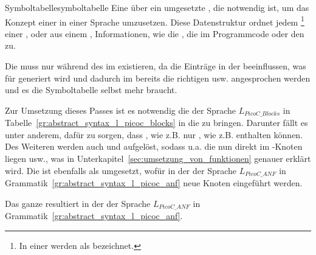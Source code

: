 \begin{Definition}{Symboltabelle}{symboltabelle}
  Eine über ein  umgesetzte , die notwendig ist, um das Konzept einer  in einer Sprache umzusetzen. Diese Datenstruktur ordnet jedem \footnote{In einer  werden  als  bezeichnet.} einer ,  oder  aus einem , Informationen, wie die , die  im Programmcode oder den  zu.

  Die  muss nur während des  im  existieren, da die Einträge in der  beeinflussen, was für  generiert wird und dadurch im  bereits die richtigen  usw. angesprochen werden und es die Symboltabelle selbst  mehr braucht.
\end{Definition}


Zur Umsetzung dieses Passes ist es notwendig die  der Sprache $L_{PicoC\_Blocks}$ in Tabelle~\ref{gr:abstract_syntax_l_picoc_blocks} in die  zu bringen. Darunter fällt es unter anderem, dafür zu sorgen, dass , wie z.B.  nur , wie z.B.  enthalten können. Des Weiteren werden auch  und  aufgelöst, sodass u.a. die   nun direkt im -Knoten liegen usw., was in Unterkapitel~\ref{sec:umsetzung_von_funktionen} genauer erklärt wird. Die  ist ebenfalls als  umgesetzt, wofür in der  der Sprache $L_{PicoC\_ANF}$ in Grammatik~\ref{gr:abstract_syntax_l_picoc_anf} neue Knoten eingeführt werden.

Das ganze resultiert in der  der Sprache $L_{PicoC\_ANF}$ in Grammatik~\ref{gr:abstract_syntax_l_picoc_anf}.

\begin{grammar}
  \toprule
  \commentsecond*
  \midrule
  \arithanf
  \midrule
  \logicanf
  \midrule
  \assignanf
  \midrule
  \pntranf*
  \midrule
  \arrayanf*
  \midrule
  \struct*
  \midrule
  \ifelseanf*
  \midrule
  \funanf*
  \midrule
  \block*
  \midrule
  \fileanf*
  \midrule
  \symbolsecond
  \bottomrule
\end{grammar}

